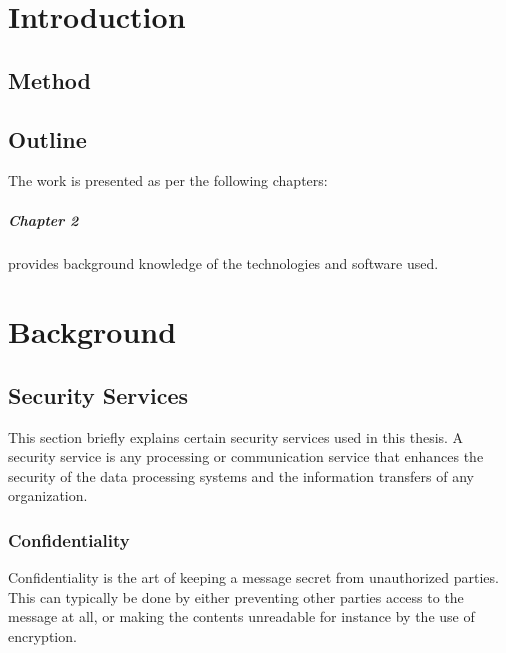 \documentclass[english,12pt,a4paper]{book}
\begin{document}
\chapter{Introduction}
\setcounter{page}{1}

\section{Method}

\section{Outline}

The work is presented as per the following chapters:

\paragraph{Chapter 2} provides background knowledge of the technologies and
software used.


\chapter{Background}


\section{Security Services}
This section briefly explains certain security services used in this
thesis. A security service is any processing or communication service that
enhances the security of the data processing systems and the information
transfers of any organization\cite[p. 12]{stallings}.

\subsection{Confidentiality} Confidentiality is the art of keeping a message
secret from unauthorized parties\cite[p. 18]{stallings}. This can typically be
done by either preventing other parties access to the message at all, or making
the contents unreadable for instance by the use of encryption. 
\end{document}
